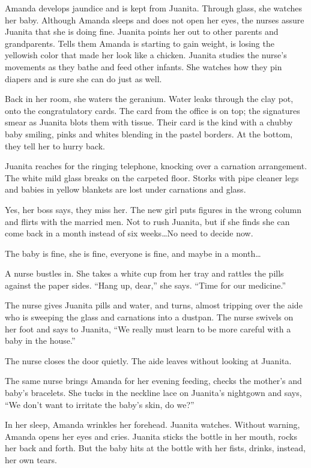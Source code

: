 \documentclass[twoside,10pt]{book}
\begin{document}
Amanda develops jaundice and is kept from Juanita. Through glass, she
watches her baby. Although Amanda sleeps and does not open her eyes, the
nurses assure Juanita that she is doing fine. Juanita points her out to
other parents and grandparents. Tells them Amanda is starting to gain
weight, is losing the yellowish color that made her look like a chicken.
Juanita studies the nurse's movements as they bathe and feed other
infants. She watches how they pin diapers and is sure she can do just as
well.

Back in her room, she waters the geranium. Water leaks through the clay
pot, onto the congratulatory cards. The card from the office is on top;
the signatures smear as Juanita blots them with tissue. Their card is
the kind with a chubby baby smiling, pinks and whites blending in the
pastel borders. At the bottom, they tell her to hurry back.

Juanita reaches for the ringing telephone, knocking over a carnation
arrangement. The white mild glass breaks on the carpeted floor. Storks
with pipe cleaner legs and babies in yellow blankets are lost under
carnations and glass.

Yes, her boss says, they miss her. The new girl puts figures in the
wrong column and flirts with the married men. Not to rush Juanita, but
if she finds she can come back in a month instead of six weeks\ldots No
need to decide now.

The baby is fine, she is fine, everyone is fine, and maybe in a
month\ldots{}

A nurse bustles in. She takes a white cup from her tray and rattles the
pills against the paper sides. ``Hang up, dear,'' she says. ``Time for
our medicine.''

The nurse gives Juanita pills and water, and turns, almost tripping over
the aide who is sweep­ing the glass and carnations into a dustpan. The
nurse swivels on her foot and says to Juanita, ``We really must learn to
be more careful with a baby in the house.''

The nurse closes the door quietly. The aide leaves without looking at
Juanita.

The same nurse brings Amanda for her evening feeding, checks the
mother's and baby's bracelets. She tucks in the neckline lace on
Juanita's nightgown and says, ``We don't want to irritate the baby's
skin, do we?''

In her sleep, Amanda wrinkles her forehead. Juanita watches. Without
warning, Amanda opens her eyes and cries. Juanita sticks the bottle in
her mouth, rocks her back and forth. But the baby hits at the bottle
with her fists, drinks, instead, her own tears.
\end{document}

